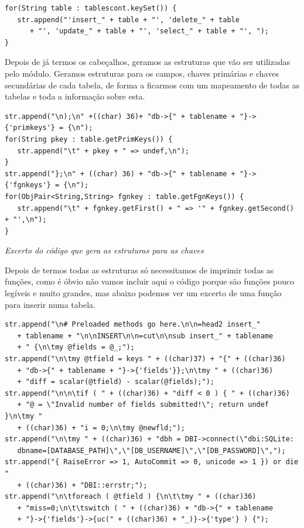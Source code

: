 \documentclass[a4paper]{article}
\begin{document}
\begin{small}
\begin{lstlisting}
for(String table : tablescont.keySet()) {
   str.append("'insert_" + table + "', 'delete_" + table
      + "', 'update_" + table + "', 'select_" + table + "', ");
}
\end{lstlisting}
\end{small}

\hspace{1cm}Depois de já termos os cabeçalhos, geramos as estruturas que vão ser utilizadas pelo módulo. Geramos estruturas para os campos, chaves primárias e chaves secundárias de cada tabela, de forma a ficarmos com um mapeamento de todas as tabelas e toda a informação sobre esta.\\

\begin{small}
\begin{lstlisting}
str.append("\n);\n" +((char) 36)+ "db->{" + tablename + "}->{'primkeys'} = {\n");
for(String pkey : table.getPrimKeys()) {
   str.append("\t" + pkey + " => undef,\n");
}
str.append("};\n" + ((char) 36) + "db->{" + tablename + "}->{'fgnkeys'} = {\n");
for(ObjPair<String,String> fgnkey : table.getFgnKeys()) {
   str.append("\t" + fgnkey.getFirst() + " => '" + fgnkey.getSecond() + "',\n");
}
\end{lstlisting}
\begin{flushright}
{\em Excerto do código que gera as estruturas para as chaves}
\end{flushright}
\end{small}

\vspace{1cm}
\hspace{1cm}Depois de termos todas as estruturas só necessitamos de imprimir todas as funções, como é óbvio não vamos incluir aqui o código porque são funções pouco legíveis e muito grandes, mas abaixo podemos ver um excerto de uma função para inserir numa tabela.\\

\begin{small}
\begin{lstlisting}
str.append("\n# Preloaded methods go here.\n\n=head2 insert_"
   + tablename + "\n\nINSERT\n\n=cut\n\nsub insert_" + tablename
   + " {\n\tmy @fields = @_;");
str.append("\n\tmy @tfield = keys " + ((char)37) + "{" + ((char)36)
   + "db->{" + tablename + "}->{'fields'}};\n\tmy " + ((char)36)
   + "diff = scalar(@tfield) - scalar(@fields);");
str.append("\n\n\tif ( " + ((char)36) + "diff < 0 ) { " + ((char)36)
   + "@ = \"Invalid number of fields submitted!\"; return undef }\n\tmy "
   + ((char)36) + "i = 0;\n\tmy @newfld;");
str.append("\n\tmy " + ((char)36) + "dbh = DBI->connect(\"dbi:SQLite:
   dbname=[DATABASE_PATH]\",\"[DB_USERNAME]\",\"[DB_PASSWORD]\",");
str.append("{ RaiseError => 1, AutoCommit => 0, unicode => 1 }) or die "
   + ((char)36) + "DBI::errstr;");
str.append("\n\tforeach ( @tfield ) {\n\t\tmy " + ((char)36)
   + "miss=0;\n\t\tswitch ( " + ((char)36) + "db->{" + tablename
   + "}->{'fields'}->{uc(" + ((char)36) + "_)}->{'type'} ) {");
\end{lstlisting}
\end{small}
\end{document}
